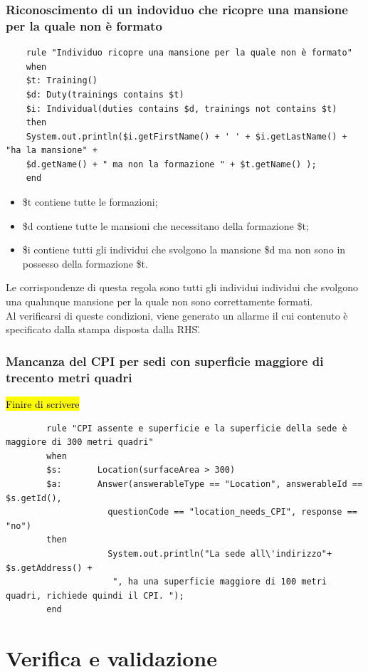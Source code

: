 \subsubsection{Riconoscimento di un indoviduo che ricopre una mansione per la quale non è formato}
	\label{Drools:regolaMansioniFormazioni}
	\begin{verbatim}
	rule "Individuo ricopre una mansione per la quale non è formato"
	when
	$t: Training()
	$d: Duty(trainings contains $t)
	$i: Individual(duties contains $d, trainings not contains $t)
	then
	System.out.println($i.getFirstName() + ' ' + $i.getLastName() + "ha la mansione" +
	$d.getName() + " ma non la formazione " + $t.getName() );
	end
	\end{verbatim}
	\begin{itemize}
		\item \$t contiene tutte le formazioni;
		\item \$d contiene  tutte le mansioni che necessitano della formazione \$t;
		\item \$i contiene tutti gli individui che svolgono la mansione \$d ma non sono in possesso della formazione \$t.
	\end{itemize}
	Le corrispondenze di questa regola sono tutti gli individui individui che svolgono una qualunque mansione per la quale non sono correttamente formati.\\
	Al verificarsi di queste condizioni, viene generato un allarme il cui contenuto è specificato dalla stampa disposta dalla \gls{RHS}\G.
	
\subsubsection{Mancanza del CPI per sedi con superficie maggiore di trecento metri quadri}
\label{Drools:regolaCPISuperficie}
\hl{Finire di scrivere}
	\begin{verbatim}
		rule "CPI assente e superficie e la superficie della sede è  maggiore di 300 metri quadri"
		when
		$s: 	  Location(surfaceArea > 300)
		$a: 	  Answer(answerableType == "Location", answerableId == $s.getId(), 
					questionCode == "location_needs_CPI", response == "no")
		then
					System.out.println("La sede all\'indirizzo"+ $s.getAddress() +
					 ", ha una superficie maggiore di 100 metri quadri, richiede quindi il CPI. ");
		end
	\end{verbatim}


\newpage
\section{Verifica e validazione}
\newpage
